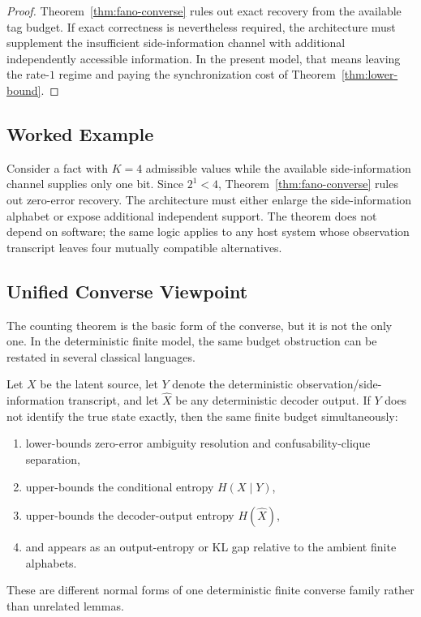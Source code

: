\begin{proof}
Theorem~\ref{thm:fano-converse} rules out exact recovery from the available tag budget. If exact correctness is nevertheless required, the architecture must supplement the insufficient side-information channel with additional independently accessible information. In the present model, that means leaving the rate-$1$ regime and paying the synchronization cost of Theorem~\ref{thm:lower-bound}.
\end{proof}

\subsection{Worked Example}\label{sec:worked-mi}

Consider a fact with $K=4$ admissible values while the available side-information channel supplies only one bit. Since $2^1 < 4$, Theorem~\ref{thm:fano-converse} rules out zero-error recovery. The architecture must either enlarge the side-information alphabet or expose additional independent support. The theorem does not depend on software; the same logic applies to any host system whose observation transcript leaves four mutually compatible alternatives.

\subsection{Unified Converse Viewpoint}\label{sec:unified-converse}

The counting theorem is the basic form of the converse, but it is not the only one. In the deterministic finite model, the same budget obstruction can be restated in several classical languages.

\begin{theorem}
Let $X$ be the latent source, let $Y$ denote the deterministic observation/side-information transcript, and let $\hat X$ be any deterministic decoder output. If $Y$ does not identify the true state exactly, then the same finite budget simultaneously:
\begin{enumerate}
\tightlist
\item lower-bounds zero-error ambiguity resolution and confusability-clique separation,
\item upper-bounds the conditional entropy $H(X\mid Y)$,
\item upper-bounds the decoder-output entropy $H(\hat X)$,
\item and appears as an output-entropy or KL gap relative to the ambient finite alphabets.
\end{enumerate}
These are different normal forms of one deterministic finite converse family rather than unrelated lemmas.
\end{theorem}

